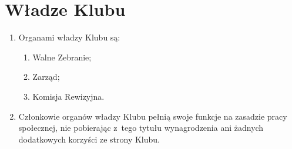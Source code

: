 \section{Władze Klubu}
\begin{enumerate}
    \item Organami władzy Klubu są:
    \begin{enumerate}
        \item Walne Zebranie;
        \item Zarząd;
        \item Komisja Rewizyjna.
    \end{enumerate}
    \item Członkowie organów władzy Klubu pełnią swoje funkcje na zasadzie pracy społecznej, nie pobierając z~tego tytułu wynagrodzenia ani żadnych dodatkowych korzyści ze strony Klubu.
\end{enumerate}
